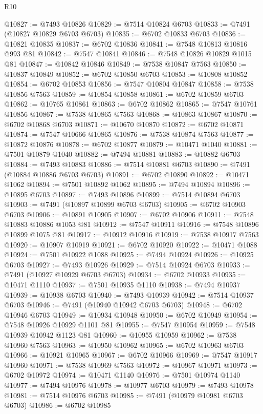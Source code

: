 \begin{lexlean}{R10}
\begin{coremodule}
@10827 := @7493 @10826
@10829 := @7514 @10824 @6703
@10833 := @7491 (@10827 @10829 @6703 @6703)
@10835 := @6702 @10833 @6703
@10836 := @10821 @10835
@10837 := @6702 @10836
@10841 := @7548 @10813 @10816 @993 @81
@10842 := @7547 @10841
@10846 := @7548 @10826 @10829 @1015 @81
@10847 := @10842 @10846
@10849 := @7538 @10847 @7563
@10850 := @10837 @10849
@10852 := @6702 @10850 @6703
@10853 := @10808 @10852
@10854 := @6702 @10853
@10856 := @7547 @10804 @10847
@10858 := @7538 @10856 @7563
@10859 := @10854 @10858
@10861 := @6702 @10859 @6703
@10862 := @10765 @10861
@10863 := @6702 @10862
@10865 := @7547 @10761 @10856
@10867 := @7538 @10865 @7563
@10868 := @10863 @10867
@10870 := @6702 @10868 @6703
@10871 := @10670 @10870
@10872 := @6702 @10871
@10874 := @7547 @10666 @10865
@10876 := @7538 @10874 @7563
@10877 := @10872 @10876
@10878 := @6702 @10877
@10879 := @10471 @1040
@10881 := @7501 @10879 @1040
@10882 := @7494 @10881
@10883 := @10882 @6703
@10884 := @7493 @10883
@10886 := @7514 @10881 @6703
@10890 := @7491 (@10884 @10886 @6703 @6703)
@10891 := @6702 @10890
@10892 := @10471 @1062
@10894 := @7501 @10892 @1062
@10895 := @7494 @10894
@10896 := @10895 @6703
@10897 := @7493 @10896
@10899 := @7514 @10894 @6703
@10903 := @7491 (@10897 @10899 @6703 @6703)
@10905 := @6702 @10903 @6703
@10906 := @10891 @10905
@10907 := @6702 @10906
@10911 := @7548 @10883 @10886 @1053 @81
@10912 := @7547 @10911
@10916 := @7548 @10896 @10899 @1075 @81
@10917 := @10912 @10916
@10919 := @7538 @10917 @7563
@10920 := @10907 @10919
@10921 := @6702 @10920
@10922 := @10471 @1088
@10924 := @7501 @10922 @1088
@10925 := @7494 @10924
@10926 := @10925 @6703
@10927 := @7493 @10926
@10929 := @7514 @10924 @6703
@10933 := @7491 (@10927 @10929 @6703 @6703)
@10934 := @6702 @10933
@10935 := @10471 @1110
@10937 := @7501 @10935 @1110
@10938 := @7494 @10937
@10939 := @10938 @6703
@10940 := @7493 @10939
@10942 := @7514 @10937 @6703
@10946 := @7491 (@10940 @10942 @6703 @6703)
@10948 := @6702 @10946 @6703
@10949 := @10934 @10948
@10950 := @6702 @10949
@10954 := @7548 @10926 @10929 @1101 @81
@10955 := @7547 @10954
@10959 := @7548 @10939 @10942 @1123 @81
@10960 := @10955 @10959
@10962 := @7538 @10960 @7563
@10963 := @10950 @10962
@10965 := @6702 @10963 @6703
@10966 := @10921 @10965
@10967 := @6702 @10966
@10969 := @7547 @10917 @10960
@10971 := @7538 @10969 @7563
@10972 := @10967 @10971
@10973 := @6702 @10972
@10974 := @10471 @1140
@10976 := @7501 @10974 @1140
@10977 := @7494 @10976
@10978 := @10977 @6703
@10979 := @7493 @10978
@10981 := @7514 @10976 @6703
@10985 := @7491 (@10979 @10981 @6703 @6703)
@10986 := @6702 @10985

\end{coremodule}
\end{lexlean}
